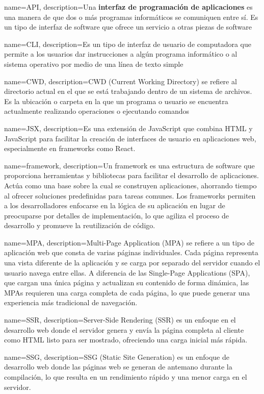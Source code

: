 {
    name=API,
    description={Una \textbf{interfaz de programación de aplicaciones} es una manera de que dos o más programas informáticos se comuniquen entre sí. Es un tipo de interfaz de software que ofrece un servicio a otras piezas de software}
}

{
    name=CLI,
    description={Es un tipo de interfaz de usuario de computadora que permite a los usuarios dar instrucciones a algún programa informático o al sistema operativo por medio de una línea de texto simple}
}

{
    name=CWD,
    description={CWD (Current Working Directory) se refiere al directorio actual en el que se está trabajando dentro de un sistema de archivos. Es la ubicación o carpeta en la que un programa o usuario se encuentra actualmente realizando operaciones o ejecutando comandos}
}

{
    name=JSX,
    description={Es una extensión de JavaScript que combina HTML y JavaScript para facilitar la creación de interfaces de usuario en aplicaciones web, especialmente en frameworks como React.}
}

{
    name=framework,
    description={Un framework es una estructura de software que proporciona herramientas y bibliotecas para facilitar el desarrollo de aplicaciones. Actúa como una base sobre la cual se construyen aplicaciones, ahorrando tiempo al ofrecer soluciones predefinidas para tareas comunes. Los frameworks permiten a los desarrolladores enfocarse en la lógica de su aplicación en lugar de preocuparse por detalles de implementación, lo que agiliza el proceso de desarrollo y promueve la reutilización de código.}
}

{
    name=MPA,
    description={Multi-Page Application (MPA) se refiere a un tipo de aplicación web que consta de varias páginas individuales. Cada página representa una vista diferente de la aplicación y se carga por separado del servidor cuando el usuario navega entre ellas. A diferencia de las Single-Page Applications (SPA), que cargan una única página y actualizan su contenido de forma dinámica, las MPAs requieren una carga completa de cada página, lo que puede generar una experiencia más tradicional de navegación.}
}

{
    name=SSR,
    description={Server-Side Rendering (SSR) es un enfoque en el desarrollo web donde el servidor genera y envía la página completa al cliente como HTML listo para ser mostrado, ofreciendo una carga inicial más rápida.}
}

{
    name=SSG,
    description={SSG (Static Site Generation) es un enfoque de desarrollo web donde las páginas web se generan de antemano durante la compilación, lo que resulta en un rendimiento rápido y una menor carga en el servidor.}
}